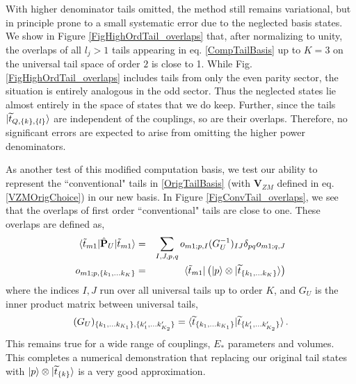 \documentclass[twocolumn,secnumarabic,amssymb, nobibnotes, aps, prd]{revtex4-2}
\newcommand{\be}{\begin{equation}}
\newcommand{\ee}{\end{equation}}
\newcommand{\bea}{\begin{eqnarray}}
\newcommand{\eea}{\end{eqnarray}}
\begin{document}
With higher denominator tails omitted, the method still remains variational, but in principle prone to a small systematic error due to the neglected basis states.
We show in Figure \ref{FigHighOrdTail_overlaps} that, after normalizing to unity, the overlaps of all $l_j>1$ tails appearing in eq. \eqref{CompTailBasis} up to $K=3$ on the universal tail space of order $2$ is close to 1. While Fig. \ref{FigHighOrdTail_overlaps} includes tails from only the even parity sector, the situation is entirely analogous in the odd sector. Thus the neglected states lie almost entirely in the space of states that we do keep. Further, since the tails $\ket{\widetilde  t_{Q,\{k\},\{l\}}}$ are independent of the couplings, so are their overlaps. Therefore, no significant errors are expected to arise from omitting the higher power denominators.

As another test of this modified computation basis, we test our ability to represent the ``conventional" tails in \eqref{OrigTailBasis} (with $\mathbf{V}_{ZM}$ defined in eq. \eqref{VZMOrigChoice}) in our new basis. In Figure \ref{FigConvTail_overlaps}, we see that the overlaps of first order ``conventional" tails are close to one. These overlaps are defined as,
\bea
\braket{\tilde t_{m1}|\hat{\mathbf{P}}_U|\tilde t_{m1}}&=&\sum_{I,J,p,q}o_{m1;p,I}(G^{-1}_U)_{IJ}\delta_{pq}o_{m1;q,J}\\
\label{ome}o_{m1;p,\{k_1,\dots k_K\}}&=&\bra{\tilde t_{m1}}\left(\ket{p}\otimes\ket{\widetilde t_{\{k_1,\dots k_K\}}}\right)
\eea
where the indices $I,J$ run over all universal tails up to order $K$, and $G_U$ is the inner product matrix between universal tails,
\be
(G_U)_{\{k_1,\dots k_{K_1}\},\{k^\prime_1,\dots k^\prime_{K_2}\}}=\braket{\widetilde{t}_{\{k_1,\dots k_{K_1}\}}|\widetilde{t}_{\{k^\prime_1,\dots k^\prime_{K_2}\}}}.
\ee
This remains true for a wide range of couplings, $E_*$ parameters and volumes.
This completes a numerical demonstration that replacing our original tail states with $\ket{p}\otimes\ket{\widetilde  t_{\{k\}}}$ is a very good approximation.
\end{document}
